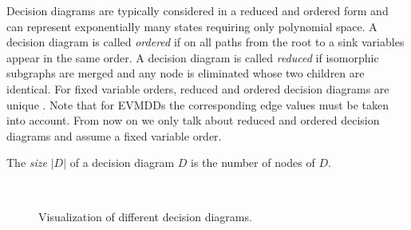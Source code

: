 Decision diagrams are typically considered in a reduced and ordered form \autocite{becker-molitor2008} and can represent exponentially many states requiring only polynomial space. A decision diagram is called \emph{ordered} if on all paths from the root to a sink variables appear in the same order. A decision diagram is called \emph{reduced} if isomorphic subgraphs are merged and any node is eliminated whose two children are identical. For fixed variable orders, reduced and ordered decision diagrams are unique \autocite{bryant-ieeecomp1986,bahar-et-al-fmsd1997,lai-et-al-ieeetc1996}.
Note that for EVMDDs the corresponding edge values must be taken into account. From now on we only talk about reduced and ordered decision diagrams and assume a fixed variable order.

\begin{definition}\label{def:dd-size}
  The \emph{size} $|D|$ of a decision diagram $D$ is the number of nodes of $D$.
\end{definition}

\begin{figure}[tbp]
  \centering
  \subfloat[ADD $A_f$ representing the numeric function $f = 2x + xy$ with size $|A_f|=5$.\label{fig:add}]{
    \centering
    \makebox[0.45\textwidth][c]{
      
    }
  }\hfill
  \subfloat[EVBDD $E_f$ representing the numeric function $f = 2x + xy$ with size $|E_f| = 3$.\label{fig:evbdd}]{
    \centering
    \makebox[0.45\textwidth][c]{
      
    }
  }
  \\
  \subfloat[BDD $B_{f=0}$ representing the characteristic function $\charf_S = \lnot x$ with size $|B_{f=0}| = 3$.\label{fig:bdd_0}]{
  \centering
  \makebox[0.3\textwidth][c]{
    
  }
  }\hfill
  \subfloat[BDD $B_{f=2}$ representing the characteristic function $\charf_S = x \land \lnot y$ with size $|B_{f=2}| = 4$.\label{fig:bdd_2}]{
  \centering
  \makebox[0.3\textwidth][c]{
    
  }
  }\hfill
  \subfloat[BDD $B_{f=3}$ representing the characteristic function $\charf_S = x \land y$ with size $|B_{f=3}| = 4$.\label{fig:bdd_3}]{
  \centering
  \makebox[0.3\textwidth][c]{
    
  }
  }\hfill
  \caption{Visualization of different decision diagrams.}
  \label{fig:bdd_add}
\end{figure}

